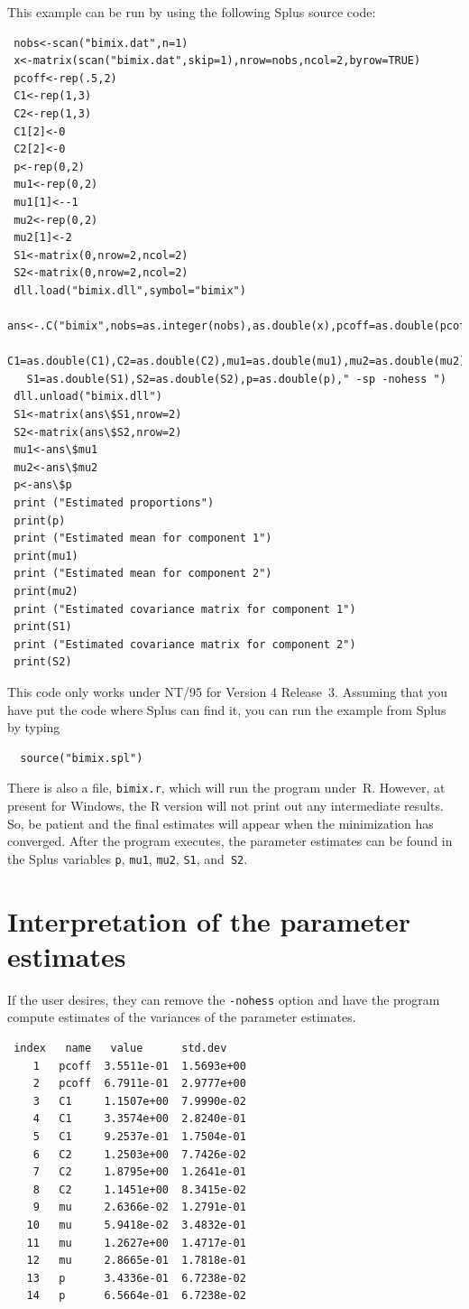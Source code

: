 This example can be run by using the following Splus source code:
\begin{lstlisting}
 nobs<-scan("bimix.dat",n=1)
 x<-matrix(scan("bimix.dat",skip=1),nrow=nobs,ncol=2,byrow=TRUE)
 pcoff<-rep(.5,2)
 C1<-rep(1,3)
 C2<-rep(1,3)
 C1[2]<-0
 C2[2]<-0
 p<-rep(0,2)
 mu1<-rep(0,2)
 mu1[1]<--1
 mu2<-rep(0,2)
 mu2[1]<-2
 S1<-matrix(0,nrow=2,ncol=2)
 S2<-matrix(0,nrow=2,ncol=2)
 dll.load("bimix.dll",symbol="bimix")
 ans<-.C("bimix",nobs=as.integer(nobs),as.double(x),pcoff=as.double(pcoff),
   C1=as.double(C1),C2=as.double(C2),mu1=as.double(mu1),mu2=as.double(mu2),
   S1=as.double(S1),S2=as.double(S2),p=as.double(p)," -sp -nohess ") 
 dll.unload("bimix.dll")
 S1<-matrix(ans\$S1,nrow=2)  
 S2<-matrix(ans\$S2,nrow=2)  
 mu1<-ans\$mu1
 mu2<-ans\$mu2
 p<-ans\$p
 print ("Estimated proportions")
 print(p)
 print ("Estimated mean for component 1")
 print(mu1)
 print ("Estimated mean for component 2")
 print(mu2)
 print ("Estimated covariance matrix for component 1")
 print(S1)
 print ("Estimated covariance matrix for component 2")
 print(S2)
\end{lstlisting}
This code  only works under NT/95 for Version 4 Release~3.
Assuming that you have put the code where Splus can find it, you can
run the example from Splus by typing
\begin{lstlisting}
  source("bimix.spl")
\end{lstlisting}
There is also a file, \texttt{bimix.r}, which will run the program under~R.
However, at present for Windows, the R version will not print out any
intermediate results.  So, be patient and the final estimates will appear
when the minimization has converged.
After the program executes, the parameter estimates can be found in
the Splus variables \texttt{p}, \texttt{mu1}, \texttt{mu2}, \texttt{S1}, and~\texttt{S2}.


\section{Interpretation of the parameter estimates}

If the user desires, they can remove the \texttt{-nohess} option and have
the program compute estimates 
of the variances of the parameter estimates. %
\begin{lstlisting}
 index   name   value      std.dev   
    1   pcoff  3.5511e-01  1.5693e+00
    2   pcoff  6.7911e-01  2.9777e+00
    3   C1     1.1507e+00  7.9990e-02
    4   C1     3.3574e+00  2.8240e-01
    5   C1     9.2537e-01  1.7504e-01
    6   C2     1.2503e+00  7.7426e-02
    7   C2     1.8795e+00  1.2641e-01
    8   C2     1.1451e+00  8.3415e-02
    9   mu     2.6366e-02  1.2791e-01
   10   mu     5.9418e-02  3.4832e-01
   11   mu     1.2627e+00  1.4717e-01
   12   mu     2.8665e-01  1.7818e-01
   13   p      3.4336e-01  6.7238e-02
   14   p      6.5664e-01  6.7238e-02
\end{lstlisting}

